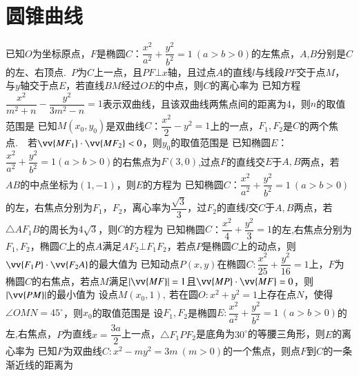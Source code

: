 \documentclass[marginline,noindent,answers,adobefonts]{BHCexam}
\begin{document}
\fubiaoti{}
\maketitle

\section{圆锥曲线}
\begin{questions}
\question
已知$O$为坐标原点，$F$是椭圆$C$：$\dfrac{x^2}{a^2}+\dfrac{y^2}{b^2}=1~(a>b>0)$的左焦点，$A$,$B$分别是$C$的左、右顶点.~$P$为$C$上一点，且$PF\bot x$轴，且过点$A$的直线$l$与线段$PF$交于点$M$，与$y$轴交于点$E$，若直线$BM$经过$OE$的中点，则$C$的离心率为\xx 
{}
\question
已知方程$\dfrac{x^2}{m^2+n}-\dfrac{y^2}{3m^2-n}=1$表示双曲线，且该双曲线两焦点间的距离为4，则$n$的取值范围是\xx
{}
\question
已知$M(x_0,y_0)$是双曲线$C$：$\dfrac{x^2}{2}-y^2=1$上的一点，$F_1,F_2$是$C$的两个焦点.~~若$\vv{MF_1}\cdot\vv{MF_2}<0$，则$y_0$的取值范围是\xx
{}
\question
已知椭圆$E$：$\dfrac{x^2}{a^2}+\dfrac{y^2}{b^2}=1(a>b>0)$的右焦点为$F(3,0)$,过点$F$的直线交$E$于$A,B$两点，若$AB$的中点坐标为$(1,-1)$，则$E$的方程为\xx
{}
\qs
已知椭圆$C$：$\dfrac{x^2}{a^2}+\dfrac{y^2}{b^2}=1~(a>b>0)$的左，右焦点分别为$F_1$，$F_2$，离心率为$\dfrac{\sqrt{3}}{3}$，过$F_2$的直线$l$交$C$于$A,B$两点，若$\triangle AF_1B$的周长为$4\sqrt{3}$，则$C$的方程为\xx
{}
\qs
已知椭圆$C$：$\dfrac{x^2}{4}+\dfrac{y^2}{3}=1$的左,右焦点分别为$F_1,F_2$，椭圆$C$上的点$A$满足$AF_2\bot F_1F_2$，若点$P$是椭圆$C$上的动点，则$\vv{F_1P}\cdot\vv{F_2A}$的最大值为\xx  
{}
\qs 已知动点$ P(x,y) $在椭圆$ C:\dfrac{x^2}{25}+\dfrac{y^2}{16}=1 $上，$ F $为椭圆$ C $的右焦点，若点$ M $满足$ |\vv{MF}|=1 $且$\vv{MP}\cdot\vv{MF}=0  $，则$ |\vv{PM}| $的最小值为\xx
{}
\qs 设点$ M(x_0,1),~ $若在圆$ O: x^2+y^2=1 $上存在点$ N $，使得$ \angle OMN=45^{\circ} $，则$ x_0 $的取值范围是\xx
{}
\qs 设$ F_1,F_2   $是椭圆$E:\dfrac{x^2}{a^2}+\dfrac{y^2}{b^2}=1~(a>b>0)$的左,右焦点，$ P $为直线$ x=\dfrac{3a}{2} $上一点，$ \triangle F_1PF_2 $是底角为$ 30^{\circ} $的等腰三角形，则$ E $的离心率为\xx
{}
\qs 已知$ F $为双曲线$ C:x^2-my^2=3m~(m>0)$的一个焦点，则点$ F $到$ C $的一条渐近线的距离为\xx
{}


\end{questions}
\end{document}
